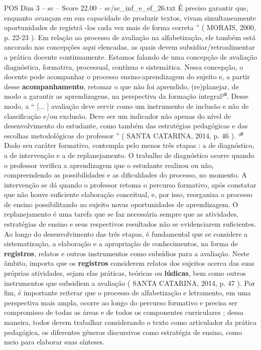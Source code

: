 \begin{textsample}{POS Dim 3 – sc – Score 22.00 – sc/sc\_inf\_e\_ef\_26.txt}
É preciso garantir que, enquanto avançam em sua capacidade de produzir textos, vivam simultaneamente oportunidades de registrá -los cada vez mais de forma correta ” ( MORAIS, 2000, p. 22-23 ).
Em relação ao processo de avaliação na alfabetização, ele também está ancorado nas concepções aqui elencadas, as quais devem subsidiar/retroalimentar a prática docente continuamente.
Estamos falando de uma concepção de avaliação diagnóstica, formativa, processual, contínua e sistemática.
Nessa concepção, o docente pode acompanhar o processo ensino-aprendizagem do sujeito e, a partir desse \textbf{acompanhamento}, retomar o que não foi aprendido, (re)planejar, de modo a garantir as aprendizagens, na perspectiva da formação integral³⁰.
Desse modo, a “ [... ] avaliação deve servir como um instrumento de inclusão e não de classificação e/ou exclusão.
Deve ser um indicador não apenas do nível de desenvolvimento do estudante, como também das estratégias pedagógicas e das escolhas metodológicas do professor ” ( SANTA CATARINA, 2014, p. 46 ). ³⁰ Dado seu caráter formativo, contempla pelo menos três etapas : a de diagnóstico, a de intervenção e a de replanejamento.
O trabalho de diagnóstico ocorre quando o professor verifica a aprendizagem que o estudante realizou ou não, compreendendo as possibilidades e as dificuldades do processo, no momento.
A intervenção se dá quando o professor retoma o percurso formativo, após constatar que não houve suficiente elaboração conceitual, e, por isso, reorganiza o processo de ensino possibilitando ao sujeito novas oportunidades de aprendizagem.
O replanejamento é uma tarefa que se faz necessária sempre que as atividades, estratégias de ensino e seus respectivos resultados não se evidenciarem suficientes.
Ao longo do desenvolvimento das três etapas, é fundamental que se considere a sistematização, a elaboração e a apropriação de conhecimentos, na forma de \textbf{registros}, relatos e outros instrumentos como subsídios para a avaliação.
Neste âmbito, importa que os \textbf{registros} considerem relatos dos sujeitos acerca das suas próprias atividades, sejam elas práticas, teóricas ou \textbf{lúdicas}, bem como outros instrumentos que subsidiem a avaliação ( SANTA CATARINA, 2014, p. 47 ).
Por fim, é importante reiterar que o processo de alfabetização e letramento, em uma perspectiva mais ampla, ocorre ao longo do percurso formativo e precisa ser compromisso de todas as áreas e de todos os componentes curriculares ; dessa maneira, todos devem trabalhar considerando o texto como articulador da prática pedagógica, os diferentes gêneros discursivos como estratégia de ensino, como meio para elaborar suas sínteses.

\end{textsample}
